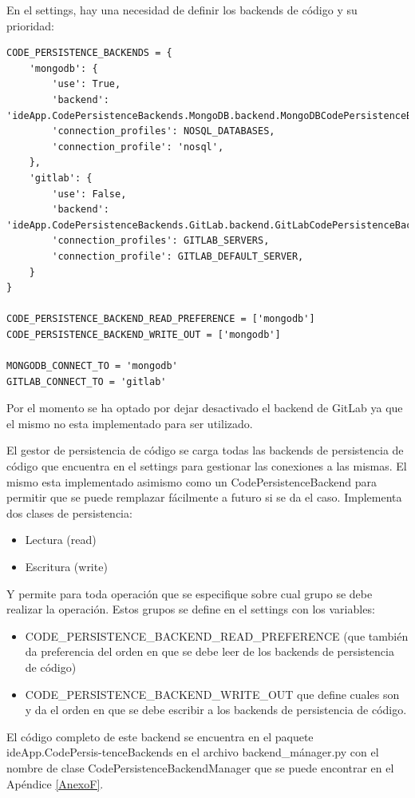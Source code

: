 En el settings, hay una necesidad de definir los backends de código y su prioridad:
\lstset{language=Python}
\begin{lstlisting}[breaklines]
CODE_PERSISTENCE_BACKENDS = {
    'mongodb': {
        'use': True,
        'backend': 'ideApp.CodePersistenceBackends.MongoDB.backend.MongoDBCodePersistenceBackend',
        'connection_profiles': NOSQL_DATABASES,
        'connection_profile': 'nosql',
    },
    'gitlab': {
        'use': False,
        'backend': 'ideApp.CodePersistenceBackends.GitLab.backend.GitLabCodePersistenceBackend',
        'connection_profiles': GITLAB_SERVERS,
        'connection_profile': GITLAB_DEFAULT_SERVER,
    }
}

CODE_PERSISTENCE_BACKEND_READ_PREFERENCE = ['mongodb']
CODE_PERSISTENCE_BACKEND_WRITE_OUT = ['mongodb']

MONGODB_CONNECT_TO = 'mongodb'
GITLAB_CONNECT_TO = 'gitlab'
\end{lstlisting}
\lstset{language=Bash}

Por el momento se ha optado por dejar desactivado el backend de GitLab ya que el mismo no esta implementado para ser utilizado.

El gestor de persistencia de código se carga todas las backends de persistencia de código que encuentra en el settings para gestionar las conexiones a las mismas. El mismo esta implementado asimismo como un CodePersistenceBackend para permitir que se puede remplazar fácilmente a futuro si se da el caso. Implementa dos clases de persistencia:
\begin{itemize}
	\item Lectura (read)
	\item Escritura (write) 
\end{itemize}
Y permite para toda operación que se especifique sobre cual grupo se debe realizar la operación. Estos grupos se define en el settings con los variables:
\begin{itemize}
	\item CODE\_PERSISTENCE\_BACKEND\_READ\_PREFERENCE (que también da preferencia del orden en que se debe leer de los backends de persistencia de código)
	\item CODE\_PERSISTENCE\_BACKEND\_WRITE\_OUT que define cuales son y da el orden en que se debe escribir a los backends de persistencia de código.
\end{itemize}
El código completo de este backend se encuentra en el paquete ideApp.CodePersis-tenceBackends en el archivo backend\_mánager.py con el nombre de clase CodePersistenceBackendManager que se puede encontrar en el Apéndice \ref{AnexoF}.

